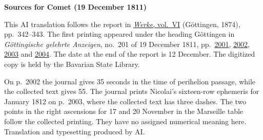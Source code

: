 \clearpage\thispagestyle{empty}
\begin{center}\textbf{Sources for Comet (19 December 1811)}\end{center}
\noindent This AI translation follows the report in \href{https://gdz.sub.uni-goettingen.de/id/PPN236007467}{\textit{Werke}, vol.~VI} (Göttingen, 1874), pp.~342--343. The first printing appeared under the heading Göttingen in \textit{Göttingische gelehrte Anzeigen}, no.~201 of 19 December 1811, pp.~\href{https://api.digitale-sammlungen.de/iiif/image/v2/bsb10538680_00977/full/1600,/0/default.jpg}{2001}, \href{https://api.digitale-sammlungen.de/iiif/image/v2/bsb10538680_00978/full/1600,/0/default.jpg}{2002}, \href{https://api.digitale-sammlungen.de/iiif/image/v2/bsb10538680_00979/full/1600,/0/default.jpg}{2003} and \href{https://api.digitale-sammlungen.de/iiif/image/v2/bsb10538680_00980/full/1600,/0/default.jpg}{2004}. The date at the end of the report is 12 December. The digitized copy is held by the Bavarian State Library.
\par\smallskip\noindent On p.~2002 the journal gives 35 seconds in the time of perihelion passage, while the collected text gives 55. The journal prints Nicolai’s sixteen-row ephemeris for January 1812 on p.~2003, where the collected text has three dashes. The two points in the right ascensions for 17 and 20 November in the Marseille table follow the collected printing. They have no assigned numerical meaning here. Translation and typesetting produced by AI.
\clearpage
